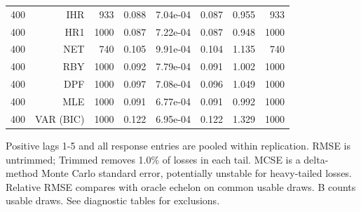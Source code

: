 \begin{table}[p]
\begin{tabular}{rrrrrrrr}
400 & IHR &  933 & 0.088 & 7.04e-04 & 0.087 & 0.955 &  933 \\
400 & HR1 & 1000 & 0.087 & 7.22e-04 & 0.087 & 0.948 & 1000 \\
400 & NET &  740 & 0.105 & 9.91e-04 & 0.104 & 1.135 &  740 \\
400 & RBY & 1000 & 0.092 & 7.79e-04 & 0.091 & 1.002 & 1000 \\
400 & DPF & 1000 & 0.097 & 7.08e-04 & 0.096 & 1.049 & 1000 \\
400 & MLE & 1000 & 0.091 & 6.77e-04 & 0.091 & 0.992 & 1000 \\
400 & VAR (BIC) & 1000 & 0.122 & 6.95e-04 & 0.122 & 1.329 & 1000 \\
\bottomrule\end{tabular}
\par\medskip
\begin{minipage}{0.98\linewidth}\footnotesize Positive lags 1-5 and all response entries are pooled within replication. RMSE is untrimmed; Trimmed removes 1.0\% of losses in each tail. MCSE is a delta-method Monte Carlo standard error, potentially unstable for heavy-tailed losses. Relative RMSE compares with oracle echelon on common usable draws. B counts usable draws. See diagnostic tables for exclusions.\end{minipage}
\end{table}
